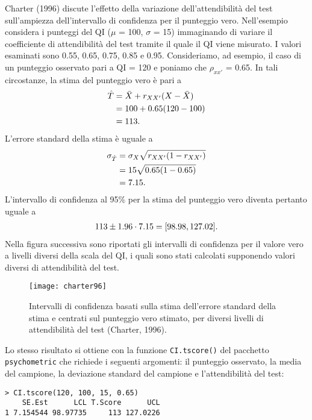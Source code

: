 \begin{exmp}
Charter (1996) discute l'effetto della variazione dell'attendibilità del test sull'ampiezza dell'intervallo di confidenza per il punteggio vero. 
Nell'esempio considera i punteggi del QI ($\mu$ = 100, $\sigma$ = 15) immaginando di variare il coefficiente di attendibilità del test tramite il quale il QI viene misurato.
I valori esaminati sono 0.55, 0.65, 0.75, 0.85 e 0.95. 
Consideriamo, ad esempio, il caso di un punteggio osservato pari a QI = 120 e poniamo che $\rho_{xx'}$ = 0.65.
In tali circostanze, la stima del punteggio vero è pari a
\begin{align}
\hat{T} &= \bar{X} + r_{XX'}  (X - \bar{X}) \notag\\
&= 100 + 0.65 (120 - 100)\notag\\
&= 113.\notag
\end{align}
L'errore standard della stima è uguale a
\begin{align}
\sigma_{\hat{T}} &= \sigma_{X} \sqrt{r_{XX'} (1 - r_{XX'})} \notag\\
&= 15 \sqrt{0.65 (1 - 0.65)}\notag\\
&= 7.15.\notag
\end{align}
L'intervallo di confidenza al 95\% per la stima del punteggio vero diventa pertanto uguale a
\begin{align}
113 \pm 1.96 \cdot 7.15 = [98.98, 127.02].\notag
\end{align}
Nella figura successiva sono riportati gli intervalli di confidenza per il valore vero a livelli diversi della scala del QI, i quali sono stati calcolati supponendo valori diversi di attendibilità del test.
\end{exmp}

\begin{figure}[h!]
\label{fig:charter_96}
\centering
\texttt{[image: charter96]}
\caption{Intervalli di confidenza basati sulla stima dell'errore standard della stima  e centrati sul punteggio vero stimato, per diversi livelli di attendibilità del test (Charter, 1996).}
\end{figure}


Lo stesso risultato si ottiene con la funzione \texttt{CI.tscore()} del pacchetto \texttt{psychometric} che richiede i seguenti argomenti: il punteggio osservato, la media del campione, la deviazione standard del campione e l'attendibilità del test:
\begin{lstlisting}
> CI.tscore(120, 100, 15, 0.65)
    SE.Est      LCL T.Score      UCL
1 7.154544 98.97735     113 127.0226
\end{lstlisting}


